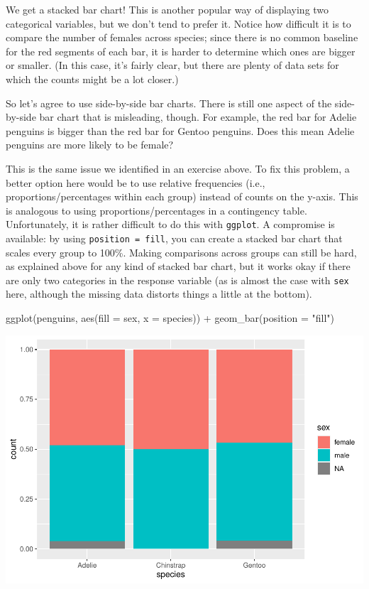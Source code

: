 \documentclass[
]{book}
\newenvironment{Shaded}{\begin{snugshade}}{\end{snugshade}}
\newcommand{\AttributeTok}[1]{\textcolor[rgb]{0.77,0.63,0.00}{#1}}
\newcommand{\FunctionTok}[1]{\textcolor[rgb]{0.00,0.00,0.00}{#1}}
\newcommand{\NormalTok}[1]{#1}
\newcommand{\SpecialCharTok}[1]{\textcolor[rgb]{0.00,0.00,0.00}{#1}}
\newcommand{\StringTok}[1]{\textcolor[rgb]{0.31,0.60,0.02}{#1}}
\begin{document}
We get a stacked bar chart! This is another popular way of displaying two categorical variables, but we don't tend to prefer it. Notice how difficult it is to compare the number of females across species; since there is no common baseline for the red segments of each bar, it is harder to determine which ones are bigger or smaller. (In this case, it's fairly clear, but there are plenty of data sets for which the counts might be a lot closer.)

So let's agree to use side-by-side bar charts. There is still one aspect of the side-by-side bar chart that is misleading, though. For example, the red bar for Adelie penguins is bigger than the red bar for Gentoo penguins. Does this mean Adelie penguins are more likely to be female?

This is the same issue we identified in an exercise above. To fix this problem, a better option here would be to use relative frequencies (i.e., proportions/percentages within each group) instead of counts on the y-axis. This is analogous to using proportions/percentages in a contingency table. Unfortunately, it is rather difficult to do this with \texttt{ggplot}. A compromise is available: by using \texttt{position\ =\ fill}, you can create a stacked bar chart that scales every group to 100\%. Making comparisons across groups can still be hard, as explained above for any kind of stacked bar chart, but it works okay if there are only two categories in the response variable (as is almost the case with \texttt{sex} here, although the missing data distorts things a little at the bottom).

\begin{Shaded}
\begin{Highlighting}[]
\FunctionTok{ggplot}\NormalTok{(penguins, }\FunctionTok{aes}\NormalTok{(}\AttributeTok{fill =}\NormalTok{ sex, }\AttributeTok{x =}\NormalTok{ species)) }\SpecialCharTok{+}
    \FunctionTok{geom\_bar}\NormalTok{(}\AttributeTok{position =} \StringTok{"fill"}\NormalTok{)}
\end{Highlighting}
\end{Shaded}

\includegraphics{intro_stats_files/figure-latex/unnamed-chunk-63-1.pdf}
\end{document}
